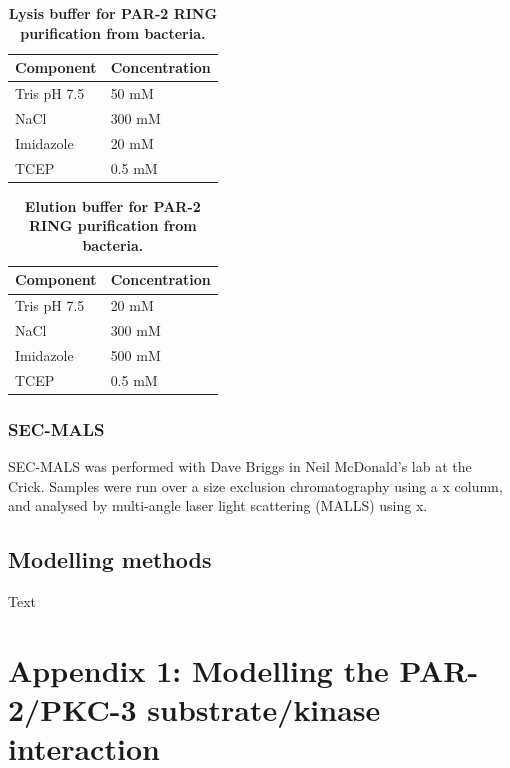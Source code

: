 \documentclass[12pt]{"report"}
\newcommand{\mycaption}[2]{\caption[#1]{\textbf{#1.} #2}}
\begin{document}
\begin{table}[]
\footnotesize
\begin{tabular}{|l|l|}
\hline
\textbf{Component} & \textbf{Concentration} \\ \hline
Tris pH 7.5 & 50 mM \\ \hline
NaCl & 300 mM \\ \hline
Imidazole & 20 mM \\ \hline
TCEP & 0.5 mM \\ \hline
\end{tabular}
\mycaption{Lysis buffer for PAR-2 RING purification from bacteria}{}
\label{table:ecoli_lysis_buffer}
\end{table}

\begin{table}[]
\footnotesize
\begin{tabular}{|l|l|}
\hline
\textbf{Component} & \textbf{Concentration} \\ \hline
Tris pH 7.5 & 20 mM \\ \hline
NaCl & 300 mM \\ \hline
Imidazole & 500 mM \\ \hline
TCEP & 0.5 mM \\ \hline
\end{tabular}
\mycaption{Elution buffer for PAR-2 RING purification from bacteria}{}
\label{table:ecoli_elution_buffer}
\end{table}


\subsection{SEC-MALS}

SEC-MALS was performed with Dave Briggs in Neil McDonald's lab at the Crick. Samples were run over a size exclusion chromatography using a x column, and analysed by multi-angle laser light scattering (MALLS) using x. \\


\section{Modelling methods}

Text


\clearpage
\chapter*{Appendix 1: Modelling the PAR-2/PKC-3 substrate/kinase interaction}
\end{document}
